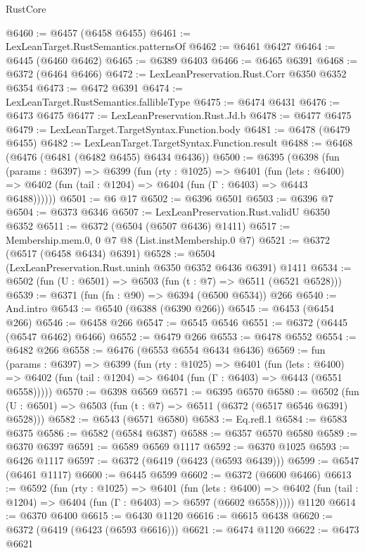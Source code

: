 \begin{lexlean}{RustCore}
\begin{coremodule}
@6460 := @6457 (@6458 @6455)
@6461 := LexLeanTarget.RustSemantics.patternsOf
@6462 := @6461 @6427
@6464 := @6445 (@6460 @6462)
@6465 := @6389 @6403
@6466 := @6465 @6391
@6468 := @6372 (@6464 @6466)
@6472 := LexLeanPreservation.Rust.Corr @6350 @6352 @6354
@6473 := @6472 @6391
@6474 := LexLeanTarget.RustSemantics.fallibleType
@6475 := @6474 @6431
@6476 := @6473 @6475
@6477 := LexLeanPreservation.Rust.Jd.b
@6478 := @6477 @6475
@6479 := LexLeanTarget.TargetSyntax.Function.body
@6481 := @6478 (@6479 @6455)
@6482 := LexLeanTarget.TargetSyntax.Function.result
@6488 := @6468 (@6476 (@6481 (@6482 @6455) @6434 @6436))
@6500 := @6395
    (@6398
      (fun (params : @6397) =>
      @6399
        (fun (rty : @1025) =>
        @6401
          (fun (lets : @6400) =>
          @6402 (fun (tail : @1204) => @6404 (fun (Γ : @6403) => @6443 @6488))))))
@6501 := @6 @17
@6502 := @6396 @6501
@6503 := @6396 @7
@6504 := @6373 @6346
@6507 := LexLeanPreservation.Rust.validU @6350 @6352
@6511 := @6372 (@6504 (@6507 @6436) @1411)
@6517 := Membership.mem.{0, 0} @7 @8 (List.instMembership.{0} @7)
@6521 := @6372 (@6517 (@6458 @6434) @6391)
@6528 := @6504 (LexLeanPreservation.Rust.uninh @6350 @6352 @6436 @6391) @1411
@6534 := @6502 (fun (U : @6501) => @6503 (fun (t : @7) => @6511 (@6521 @6528)))
@6539 := @6371 (fun (fn : @90) => @6394 (@6500 @6534)) @266
@6540 := And.intro
@6543 := @6540 (@6388 (@6390 @266))
@6545 := @6453 (@6454 @266)
@6546 := @6458 @266
@6547 := @6545 @6546
@6551 := @6372 (@6445 (@6547 @6462) @6466)
@6552 := @6479 @266
@6553 := @6478 @6552
@6554 := @6482 @266
@6558 := @6476 (@6553 @6554 @6434 @6436)
@6569 := fun (params : @6397) =>
  @6399
    (fun (rty : @1025) =>
    @6401
      (fun (lets : @6400) =>
      @6402 (fun (tail : @1204) => @6404 (fun (Γ : @6403) => @6443 (@6551 @6558)))))
@6570 := @6398 @6569
@6571 := @6395 @6570
@6580 := @6502 (fun (U : @6501) => @6503 (fun (t : @7) => @6511 (@6372 (@6517 @6546 @6391) @6528)))
@6582 := @6543 (@6571 @6580)
@6583 := Eq.refl.{1}
@6584 := @6583 @6375
@6586 := @6582 (@6584 @6387)
@6588 := @6357 @6570 @6580
@6589 := @6370 @6397
@6591 := @6589 @6569 @1117
@6592 := @6370 @1025
@6593 := @6426 @1117
@6597 := @6372 (@6419 (@6423 (@6593 @6439)))
@6599 := @6547 (@6461 @1117)
@6600 := @6445 @6599
@6602 := @6372 (@6600 @6466)
@6613 := @6592
    (fun (rty : @1025) =>
    @6401
      (fun (lets : @6400) =>
      @6402 (fun (tail : @1204) => @6404 (fun (Γ : @6403) => @6597 (@6602 @6558)))))
    @1120
@6614 := @6370 @6400
@6615 := @6430 @1120
@6616 := @6615 @6438
@6620 := @6372 (@6419 (@6423 (@6593 @6616)))
@6621 := @6474 @1120
@6622 := @6473 @6621

\end{coremodule}
\end{lexlean}
